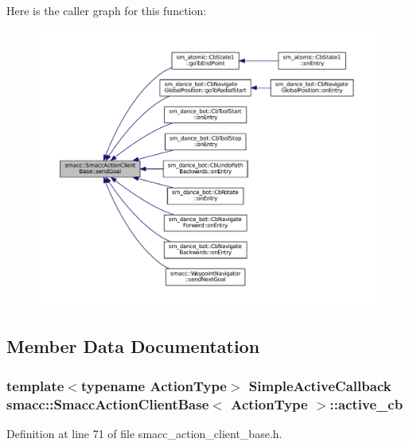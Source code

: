 Here is the caller graph for this function\+:
\nopagebreak
\begin{figure}[H]
\begin{center}
\leavevmode
\includegraphics[width=350pt]{classsmacc_1_1SmaccActionClientBase_a58c67a87c5fb8ea1633573c58fe3eee1_icgraph}
\end{center}
\end{figure}




\subsection{Member Data Documentation}
\subsubsection[{\texorpdfstring{active\+\_\+cb}{active_cb}}]{\setlength{\rightskip}{0pt plus 5cm}template$<$typename Action\+Type$>$ {\bf Simple\+Active\+Callback} {\bf smacc\+::\+Smacc\+Action\+Client\+Base}$<$ Action\+Type $>$\+::active\+\_\+cb}\hypertarget{classsmacc_1_1SmaccActionClientBase_ac46979611051357b9fa54baa370f84d7}{}\label{classsmacc_1_1SmaccActionClientBase_ac46979611051357b9fa54baa370f84d7}


Definition at line 71 of file smacc\+\_\+action\+\_\+client\+\_\+base.\+h.

